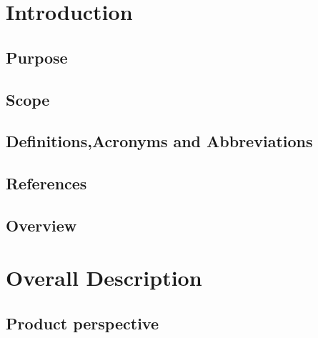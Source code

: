 \documentclass[a4paper,12pt]{article}
\begin{document}
    \tableofcontents
    \section{Introduction}
    	
        \subsection{Purpose}
        
        \subsection{Scope}
        
        \subsection{Definitions,Acronyms and Abbreviations}
        
        \subsection{References}
        
        \subsection{Overview}
        
    
    \section{Overall Description}
    
    	\subsection{Product perspective}
    	
\end{document}

